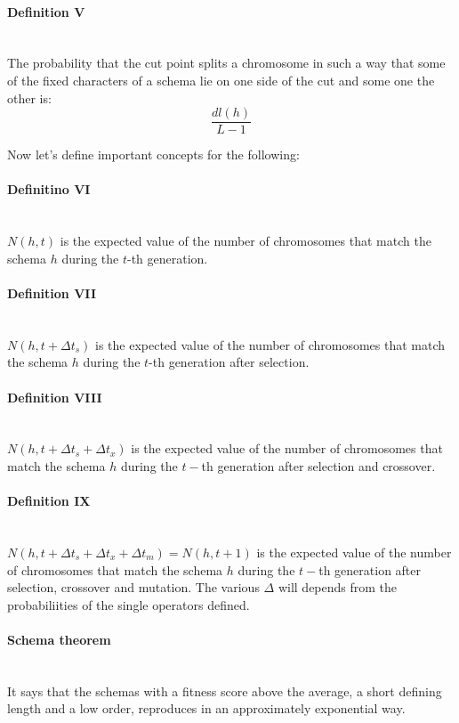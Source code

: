 \documentclass{article}
\begin{document}
\paragraph{Definition V}\mbox{}\\
The probability that the cut point splits a chromosome in such a way that some of the fixed
characters of a schema lie on one side of the cut and some one the other is:
$$\frac{dl(h)}{L-1}$$

Now let's define important concepts for the following:
\paragraph{Definitino VI}\mbox{}\\
$N(h,t)$ is the expected value of the number of chromosomes that match the schema $h$
during the $t$-th generation.

\paragraph{Definition VII}\mbox{}\\
$N(h,t+\Delta t_s)$ is the expected value of the number of chromosomes that match the schema
$h$ during the $t$-th generation after selection.

\paragraph{Definition VIII}\mbox{}\\
$N(h,t+\Delta t_s + \Delta t_x)$ is the expected value of the number of chromosomes that match the
schema $h$ during the $t-$th generation after selection and crossover.

\paragraph{Definition IX}\mbox{}\\
$N(h,t+\Delta t_s+\Delta t_x+\Delta t_m)=N(h,t+1)$ is the expected value of the number of
chromosomes that match the schema $h$ during the $t-$th generation after selection, crossover and
mutation.
The various $\Delta$ will depends from the probabiliities of the single operators defined.

\paragraph{Schema theorem}\mbox{}\\
It says that the schemas with a fitness score above the average, a short defining length and
a low order, reproduces in an approximately exponential way.
\end{document}
